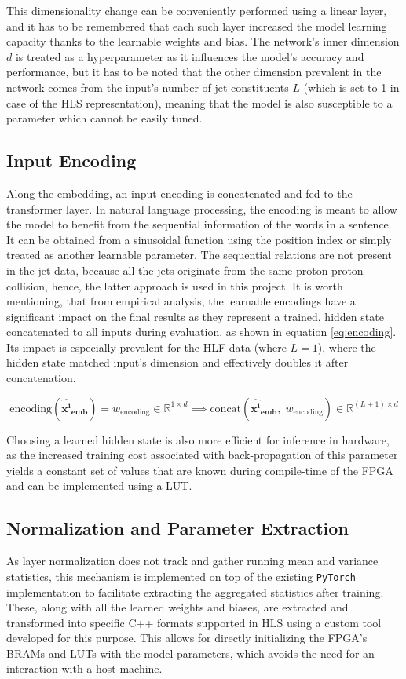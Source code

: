 This dimensionality change can be conveniently performed using a linear layer, and it has to be remembered that each such layer increased the model learning capacity thanks to the learnable weights and bias. The network's inner dimension \(d\) is treated as a hyperparameter as it influences the model's accuracy and performance, but it has to be noted that the other dimension prevalent in the network comes from the input's number of jet constituents \(L\) (which is set to 1 in case of the HLS representation), meaning that the model is also susceptible to a parameter which cannot be easily tuned.


\subsection{Input Encoding}
Along the embedding, an input encoding is concatenated and fed to the transformer layer. In natural language processing, the encoding is meant to allow the model to benefit from the sequential information of the words in a sentence. It can be obtained from a sinusoidal function using the position index or simply treated as another learnable parameter. The sequential relations are not present in the jet data, because all the jets originate from the same proton-proton collision, hence, the latter approach is used in this project. It is worth mentioning, that from empirical analysis, the learnable encodings have a significant impact on the final results as they represent a trained, hidden state concatenated to all inputs during evaluation, as shown in equation \ref{eq:encoding}. Its impact is especially prevalent for the HLF data (where \(L = 1\)), where the hidden state matched input's dimension and effectively doubles it after concatenation.

\begin{equation}\label{eq:encoding}
  \text{encoding} ( \bm{\hat{x^i}_{\text{emb}}} ) = w_{\text{encoding}} \in \mathbb{R}^{1 \times d} \implies \text{concat} (\bm{\hat{x^i}_{\text{emb}}},\; w_{\text{encoding}}) \in \mathbb{R}^{(L+1) \times d}
\end{equation}

Choosing a learned hidden state is also more efficient for inference in hardware, as the increased training cost associated with back-propagation of this parameter yields a constant set of values that are known during compile-time of the FPGA and can be implemented using a LUT.


\subsection{Normalization and Parameter Extraction}\label{model-normalization}
As layer normalization does not track and gather running mean and variance statistics, this mechanism is implemented on top of the existing \texttt{PyTorch} implementation to facilitate extracting the aggregated statistics after training. These, along with all the learned weights and biases, are extracted and transformed into specific C++ formats supported in HLS using a custom tool developed for this purpose. This allows for directly initializing the FPGA's BRAMs and LUTs with the model parameters, which avoids the need for an interaction with a host machine.

